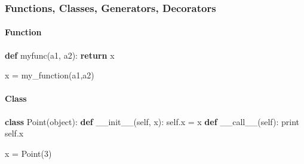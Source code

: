 \documentclass[10pt,a4paperpaper,twocolumn]{article}
\newenvironment{Shaded}{}{}
\newcommand{\KeywordTok}[1]{\textcolor[rgb]{0.00,0.44,0.13}{\textbf{{#1}}}}
\newcommand{\DecValTok}[1]{\textcolor[rgb]{0.25,0.63,0.44}{{#1}}}
\newcommand{\FunctionTok}[1]{\textcolor[rgb]{0.02,0.16,0.49}{{#1}}}
\newcommand{\VariableTok}[1]{\textcolor[rgb]{0.10,0.09,0.49}{{#1}}}
\newcommand{\ControlFlowTok}[1]{\textcolor[rgb]{0.00,0.44,0.13}{\textbf{{#1}}}}
\newcommand{\OperatorTok}[1]{\textcolor[rgb]{0.40,0.40,0.40}{{#1}}}
\newcommand{\BuiltInTok}[1]{{#1}}
\newcommand{\NormalTok}[1]{{#1}}
\let\oldparagraph\paragraph
\renewcommand{\paragraph}[1]{\oldparagraph{#1}\mbox{}}
\begin{document}
\begin{Shaded}
\end{Shaded}

\hypertarget{functions-classes-generators-decorators}{\subsubsection{Functions,
Classes, Generators,
Decorators}\label{functions-classes-generators-decorators}}

\hypertarget{function}{\paragraph{Function}\label{function}}

\begin{Shaded}
\begin{Highlighting}[]
\KeywordTok{def} \NormalTok{myfunc(a1, a2):}
    \ControlFlowTok{return} \NormalTok{x}

\NormalTok{x }\OperatorTok{=} \NormalTok{my_function(a1,a2)}
\end{Highlighting}
\end{Shaded}

\hypertarget{class}{\paragraph{Class}\label{class}}

\begin{Shaded}
\begin{Highlighting}[]
\KeywordTok{class} \NormalTok{Point(}\BuiltInTok{object}\NormalTok{):}
    \KeywordTok{def} \FunctionTok{__init__}\NormalTok{(}\VariableTok{self}\NormalTok{, x):}
        \VariableTok{self}\NormalTok{.x }\OperatorTok{=} \NormalTok{x}
    \KeywordTok{def} \FunctionTok{__call__}\NormalTok{(}\VariableTok{self}\NormalTok{):}
        \BuiltInTok{print} \VariableTok{self}\NormalTok{.x}

\NormalTok{x }\OperatorTok{=} \NormalTok{Point(}\DecValTok{3}\NormalTok{)}
\end{Highlighting}
\end{Shaded}
\end{document}
